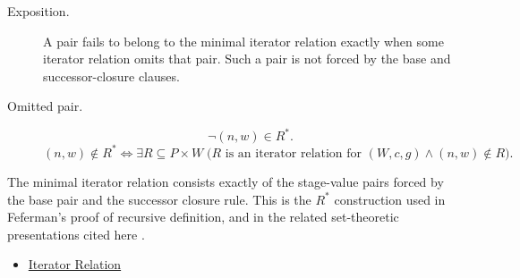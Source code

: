\begin{remark*}
\begin{description}
  \item[Exposition.]
  A pair fails to belong to the minimal iterator relation exactly when some
  iterator relation omits that pair. Such a pair is not forced by the base and
  successor-closure clauses.
  \item[Omitted pair.]
  \[
  \neg (n,w)\in R^*.
  \]
  \[
  (n,w)\notin R^*
  \Longleftrightarrow
  \exists R\subseteq P\times W\;
  \bigl(R \text{ is an iterator relation for } (W,c,g)\land (n,w)\notin R\bigr).
  \]
\end{description}
\end{remark*}

\begin{remark*}[Interpretation]
The minimal iterator relation consists exactly of the stage-value pairs forced
by the base pair and the successor closure rule. This is the $R^*$ construction
used in Feferman's proof of recursive definition, and in the related
set-theoretic presentations cited here
\citep{FefermanNumberSystems1964,hrbacek_jech1999,chi_recursion_wustl}.
\end{remark*}

\begin{dependencies}
\begin{itemize}
  \item \hyperref[def:iterator-relation]{Iterator Relation}
\end{itemize}
\end{dependencies}

